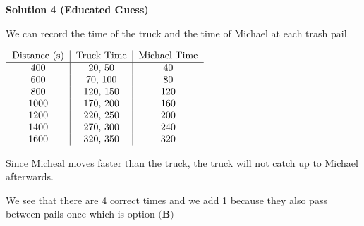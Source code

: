 \begin{enumerate}
 


 



\textbf{Solution 4 (Educated Guess)}

We can record the time of the truck and the time of Michael at each trash pail. 

 $\begin{tabular}{c|c|c}Distance (s) &Truck Time&Michael Time\\ \hline 400&20, 50&40\\ 600&70, 100&80\\ 800&120, 150&120\\ 1000&170, 200&160\\ 1200&220, 250&200\\ 1400&270, 300&240\\ 1600&320, 350&320\\ \end{tabular}$

 Since Micheal moves faster than the truck, the truck will not catch up to Michael afterwards.

 We see that there are 4 correct times and we add 1 because they also pass between pails once which is option $\boxed{\textbf{(B)}}$



\end{enumerate}